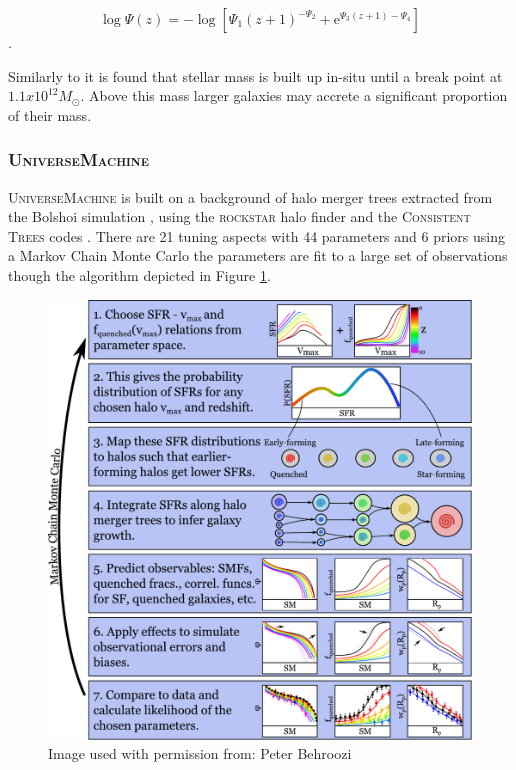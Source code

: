 \begin{equation}
\log \Psi(z) =-\log \left[\Psi_{1}(z+1)^{-\Psi_{2}}+\mathrm{e}^{\Psi_{3}(z+1)-\Psi_{4}}\right] 
\end{equation}.

Similarly to \citet{Rodriguez-Puebla2017ConstrainingProperties} it is found that stellar mass is built up in-situ until a break point at $1.1 x 10^{12} M_{\odot}$. Above this mass larger galaxies may accrete a significant proportion of their mass.

\subsubsection{U\textsc{niverse}M\textsc{achine}}
U\textsc{niverse}M\textsc{achine} \cite{Behroozi2019UniverseMachine:010} is built on a background of halo merger trees extracted from the Bolshoi simulation \citep{Klypin2016,Rodriguez-Puebla2016HaloSimulations}, using the \textsc{rockstar} halo finder and the C\textsc{onsistent} T\textsc{rees} codes \cite{Behroozi2013TheCores, Behroozi2013GRAVITATIONALLYCOSMOLOGY}. There are 21 tuning aspects with 44 parameters and 6 priors using a Markov Chain Monte Carlo the parameters are fit to a large set of observations though the algorithm depicted in Figure \ref{fig:BehMeth}.

\begin{figure}[h]
    \centering
    \includegraphics[width = \linewidth]{Figures/Chapter1/sfr_method.pdf}
    \caption{Image used with permission from: Peter Behroozi \cite{Behroozi2019UniverseMachine:010}}
    \label{fig:BehMeth}
\end{figure}


